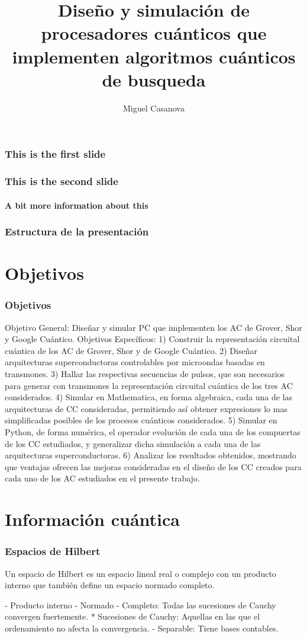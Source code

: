 \documentclass[xetex,mathserif,serif]{beamer}
\title[Simulación de procesadores cuánticos] %
{Diseño y simulación de procesadores cuánticos que implementen algoritmos cuánticos de busqueda}
\author[M. Casanova] %
{Miguel Casanova}
\institute[Universidad Simón Bolívar] %
{
  Coordinación de Tecnología e Ingeniería Electrónica\\
  Universidad Simón Bolívar
}
\begin{document}
\frame{\titlepage}

  \begin{frame}
    \frametitle{This is the first slide}
  \end{frame}
  \begin{frame}
    \frametitle{This is the second slide}
    \framesubtitle{A bit more information about this}
  \end{frame}

\begin{frame}
\frametitle{Estructura de la presentación}
\tableofcontents
\end{frame}

\section{Objetivos}
\begin{frame}
    \frametitle{Objetivos}

Objetivo General:
 Diseñar y simular PC que implementen los AC de Grover, Shor y Google
Cuántico.
Objetivos Específicos:
1) Construir la representación circuital cuántica de los AC de Grover, Shor y de Google Cuántico.
2) Diseñar arquitecturas superconductoras controlables por microondas basadas en transmones.
3) Hallar las respectivas secuencias de pulsos, que son necesarios para generar con transmones la
representación circuital cuántica de los tres AC considerados.
4) Simular en Mathematica, en forma algebraica, cada una de las arquitecturas de CC consideradas,
permitiendo así obtener expresiones lo mas simplificadas posibles de los procesos cuánticos considerados.
5) Simular en Python, de forma numérica, el operador evolución de cada una de los compuertas de los CC
estudiados, y generalizar dicha simulación a cada una de las arquitecturas superconductoras.
6) Analizar los resultados obtenidos, mostrando que ventajas ofrecen las mejoras consideradas en el
diseño de los CC creados para cada uno de los AC estudiados en el presente trabajo.
\end{frame}

\section{Información cuántica}

\begin{frame}
    \frametitle{Espacios de Hilbert}

Un espacio de Hilbert es un espacio lineal real o complejo con un producto interno que también define un espacio normado completo.

- Producto interno
- Normado
- Completo: Todas las sucesiones de Cauchy convergen fuertemente.
    * Sucesiones de Cauchy: Aquellas en las que el ordenamiento no afecta la convergencia.
- Separable: Tiene bases contables.

\end{frame}
\end{document}
